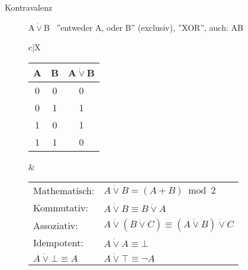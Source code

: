 \documentclass[12pt,a4paper]{article}
\begin{document}
\begin{description}
\begin{description}
			\item[Kontravalenz] A$\dot{\vee}$B \, ''entweder A, oder B'' (exclusiv), ''XOR'', auch: A\oplus B \\
				\begin{tabularx}{\linewidth}{c|X}
					\begin{tabular}[t]{c|c||c}
						A & B & A$\dot{\vee}$B \\ \hline\hline
						0 & 0 & 0 \\ \hline
						0 & 1 & 1 \\ \hline
						1 & 0 & 1 \\ \hline
						1 & 1 & 0
					\end{tabular} &
					\begin{tabular}[t]{ll}
						Mathematisch: & $A \dot{\vee} B = (A + B)\bmod 2$ \\
						Kommutativ: & $A \dot{\vee} B \equiv B \dot{\vee} A$ \\
						Assoziativ: & $A \dot{\vee} (B \dot{\vee} C) \equiv (A \dot{\vee} B) \dot{\vee} C$ \\
						\neg Idempotent: & $A \dot{\vee} A \equiv \bot$ \\
						$A \dot{\vee} \bot \equiv A$ & $A \dot{\vee} \top \equiv \neg A$
					\end{tabular} \\ \hline
				\end{tabularx}
				

\end{description}
\end{description}
\end{document}
